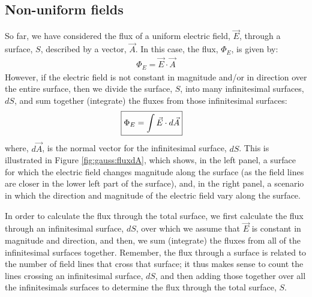 \subsection{Non-uniform fields}
So far, we have considered the flux of a uniform electric field, $\vec E$, through a surface, $S$, described by a vector, $\vec A$. In this case, the flux, $\Phi_E$, is given by:
\begin{align*}
\Phi_E=\vec E\cdot \vec A
\end{align*}
However, if the electric field is not constant in magnitude and/or in direction over the entire surface, then we divide the surface, $S$, into many infinitesimal surfaces, $dS$, and sum together (integrate) the fluxes from those infinitesimal surfaces:
\begin{align*}
\Aboxed{\Phi_E=\int \vec E\cdot d\vec A}
\end{align*}
where, $d\vec A$, is the normal vector for the infinitesimal surface, $dS$. This is illustrated in Figure \ref{fig:gauss:fluxdA}, which shows, in the left panel, a surface for which the electric field changes magnitude along the surface (as the field lines are closer in the lower left part of the surface), and, in the right panel, a scenario in which the direction and magnitude of the electric field vary along the surface.

In order to calculate the flux through the total surface, we first calculate the flux through an infinitesimal surface, $dS$, over which we assume that $\vec E$ is constant in magnitude and direction, and then, we sum (integrate) the fluxes from all of the infinitesimal surfaces together. Remember, the flux through a surface is related to the number of field lines that cross that surface; it thus makes sense to count the lines crossing an infinitesimal surface, $dS$, and then adding those together over all the infinitesimals surfaces to determine the flux through the total surface, $S$.

